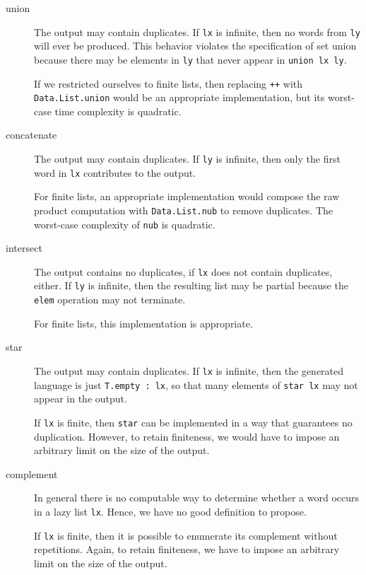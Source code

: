\begin{description}
\item[union] The output may contain duplicates. If
  \texttt{lx} is infinite, then no words from \texttt{ly} will ever be
  produced. This behavior violates the specification of set union
  because there may be elements in \texttt{ly} that never appear in
  \texttt{union lx ly}.

  If we restricted ourselves to finite lists, then replacing
  \texttt{++} with \texttt{Data.List.union} would be an appropriate
  implementation, but its worst-case time complexity is quadratic.
\item[concatenate] The output may contain duplicates. If \texttt{ly}
  is infinite, then only the first word in \texttt{lx} contributes to
  the output.

  For finite lists, an appropriate implementation would compose the
  raw product computation with \texttt{Data.List.nub} to remove
  duplicates. The worst-case complexity of \texttt{nub} is quadratic.
\item[intersect] The output contains no duplicates, if \texttt{lx}
  does not contain duplicates, either. If \texttt{ly} is infinite,
  then the resulting list may be partial because the \texttt{elem}
  operation may not terminate.

  For finite lists, this implementation is appropriate.
\item[star] The output may contain duplicates. If \texttt{lx} is
  infinite, then the generated language is just \texttt{T.empty : lx},
  so that many elements of \texttt{star lx} may not appear in the
  output.

  If \texttt{lx} is finite, then \texttt{star} can
  be implemented in a way that guarantees no duplication. However, to
  retain finiteness, we would have to impose an arbitrary limit on the
  size of the output.
\item[complement] In general there is no computable way to determine
  whether a word occurs in a lazy list \texttt{lx}. Hence, we have no
  good definition to propose.

  If \texttt{lx} is finite, then it is possible to
  enumerate its complement without repetitions. Again, to retain
  finiteness, we have to impose an arbitrary limit on the size
  of the output.
\end{description}

